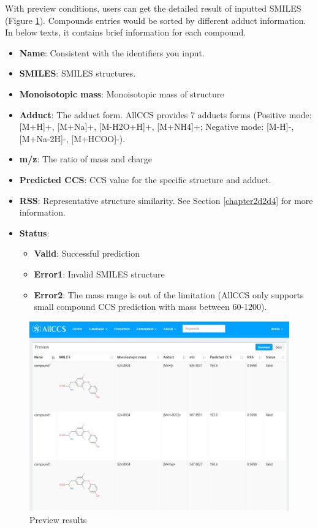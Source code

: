 \documentclass[12pt,]{book}
\providecommand{\tightlist}{%
  \setlength{\itemsep}{0pt}\setlength{\parskip}{0pt}}
\theoremstyle{definition}
\theoremstyle{definition}
\theoremstyle{definition}
\theoremstyle{remark}
\begin{document}
With preview conditions, users can get the detailed result of inputted
SMILES (Figure \ref{fig:figure3d3}). Compounds entries would be sorted
by different adduct information. In below texts, it contains brief
information for each compound.

\begin{itemize}
\tightlist
\item
  \textbf{Name}: Consistent with the identifiers you input.
\item
  \textbf{SMILES}: SMILES structures.
\item
  \textbf{Monoisotopic mass}: Monoisotopic mass of structure
\item
  \textbf{Adduct}: The adduct form. AllCCS provides 7 adducts forms
  (Positive mode: {[}M+H{]}+, {[}M+Na{]}+, {[}M-H2O+H{]}+, {[}M+NH4{]}+;
  Negative mode: {[}M-H{]}-, {[}M+Na-2H{]}-, {[}M+HCOO{]}-).
\item
  \textbf{m/z}: The ratio of mass and charge
\item
  \textbf{Predicted CCS}: CCS value for the specific structure and
  adduct.
\item
  \textbf{RSS}: Representative structure similarity. See Section
  \ref{chapter2d2d4} for more information.
\item
  \textbf{Status}:

  \begin{itemize}
  \tightlist
  \item
    \textbf{Valid}: Successful prediction
  \item
    \textbf{Error1}: Invalid SMILES structure
  \item
    \textbf{Error2}: The mass range is out of the limitation (AllCCS
    only supports small compound CCS prediction with mass between
    60-1200).
  \end{itemize}
\end{itemize}

\begin{figure}

{\centering \includegraphics{images/chapter3/figure3.3preview_result} 

}

\caption{Preview results}\label{fig:figure3d3}
\end{figure}
\end{document}
